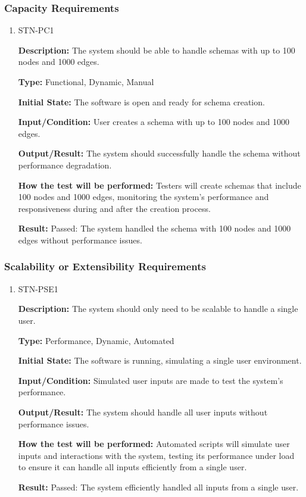 \documentclass[12pt, titlepage]{article}
\begin{document}
\subsubsection{Capacity Requirements}

\begin{enumerate}

\item{STN-PC1\\}

\textbf{Description:} The system should be able to handle schemas with up to 100 nodes and 1000 edges.

\textbf{Type:} Functional, Dynamic, Manual

\textbf{Initial State:} The software is open and ready for schema creation.

\textbf{Input/Condition:} User creates a schema with up to 100 nodes and 1000 edges.

\textbf{Output/Result:} The system should successfully handle the schema without performance degradation.

\textbf{How the test will be performed:} Testers will create schemas that include 100 nodes and 1000 edges, monitoring the system’s performance and responsiveness during and after the creation process.

\textbf{Result:} Passed: The system handled the schema with 100 nodes and 1000 edges without performance issues.

\end{enumerate}

\subsubsection{Scalability or Extensibility Requirements}

\begin{enumerate}

\item{STN-PSE1\\}

\textbf{Description:} The system should only need to be scalable to handle a single user.

\textbf{Type:} Performance, Dynamic, Automated

\textbf{Initial State:} The software is running, simulating a single user environment.

\textbf{Input/Condition:} Simulated user inputs are made to test the system’s performance.

\textbf{Output/Result:} The system should handle all user inputs without performance issues.

\textbf{How the test will be performed:} Automated scripts will simulate user inputs and interactions with the system, testing its performance under load to ensure it can handle all inputs efficiently from a single user.

\textbf{Result:} Passed: The system efficiently handled all inputs from a single user.

\end{enumerate}
\end{document}
